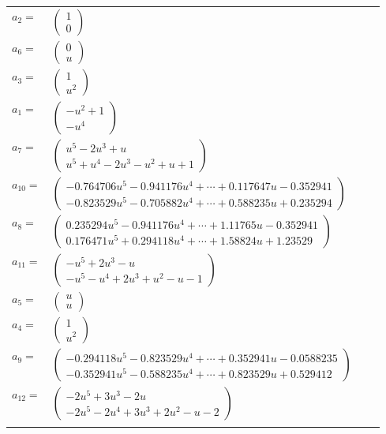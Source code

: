 \documentclass[1p]{elsarticle_modified}
\theoremstyle{definition}
\begin{document}
\begin{tabular}{m{7pt} m{180pt} m{7pt} m{180pt} }
\flushright $a_{2}=$&$\begin{pmatrix}1\\0\end{pmatrix}$ \\
\flushright $a_{6}=$&$\begin{pmatrix}0\\u\end{pmatrix}$ \\
\flushright $a_{3}=$&$\begin{pmatrix}1\\u^2\end{pmatrix}$ \\
\flushright $a_{1}=$&$\begin{pmatrix}- u^2+1\\- u^4\end{pmatrix}$ \\
\flushright $a_{7}=$&$\begin{pmatrix}u^5-2 u^3+u\\u^5+u^4-2 u^3- u^2+u+1\end{pmatrix}$ \\
\flushright $a_{10}=$&$\begin{pmatrix}-0.764706 u^{5}-0.941176 u^{4}+\cdots+0.117647 u-0.352941\\-0.823529 u^{5}-0.705882 u^{4}+\cdots+0.588235 u+0.235294\end{pmatrix}$ \\
\flushright $a_{8}=$&$\begin{pmatrix}0.235294 u^{5}-0.941176 u^{4}+\cdots+1.11765 u-0.352941\\0.176471 u^{5}+0.294118 u^{4}+\cdots+1.58824 u+1.23529\end{pmatrix}$ \\
\flushright $a_{11}=$&$\begin{pmatrix}- u^5+2 u^3- u\\- u^5- u^4+2 u^3+u^2- u-1\end{pmatrix}$ \\
\flushright $a_{5}=$&$\begin{pmatrix}u\\u\end{pmatrix}$ \\
\flushright $a_{4}=$&$\begin{pmatrix}1\\u^2\end{pmatrix}$ \\
\flushright $a_{9}=$&$\begin{pmatrix}-0.294118 u^{5}-0.823529 u^{4}+\cdots+0.352941 u-0.0588235\\-0.352941 u^{5}-0.588235 u^{4}+\cdots+0.823529 u+0.529412\end{pmatrix}$ \\
\flushright $a_{12}=$&$\begin{pmatrix}-2 u^5+3 u^3-2 u\\-2 u^5-2 u^4+3 u^3+2 u^2- u-2\end{pmatrix}$\\&\end{tabular}
\end{document}
